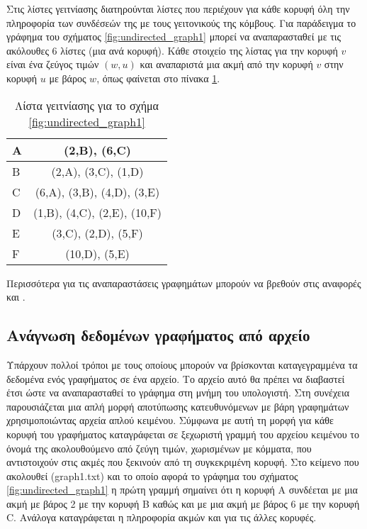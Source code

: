 Στις λίστες γειτνίασης διατηρούνται λίστες που περιέχουν για κάθε κορυφή όλη την πληροφορία των συνδέσεών της με τους γειτονικούς της κόμβους. Για παράδειγμα το γράφημα του σχήματος \ref{fig:undirected_graph1} μπορεί να αναπαρασταθεί με τις ακόλουθες 6 λίστες (μια ανά κορυφή). Κάθε στοιχείο της λίστας για την κορυφή $v$ είναι ένα ζεύγος τιμών $(w,u)$ και αναπαριστά μια ακμή από την κορυφή $v$ στην κορυφή $u$ με βάρος $w$, όπως φαίνεται στο πίνακα \ref{tbl:adjacency_list}.

\begin{table}[ht]
	\centering
	\begin{tabular}{|
		>{\columncolor[HTML]{C0C0C0}}l |c|}
		\hline
		A & (2,B), (6,C)                \\ \hline
		B & (2,A), (3,C), (1,D)         \\ \hline
		C & (6,A), (3,B), (4,D), (3,E)  \\ \hline
		D & (1,B), (4,C), (2,E), (10,F) \\ \hline
		E & (3,C), (2,D), (5,F)         \\ \hline
		F & (10,D), (5,E)               \\ \hline
	\end{tabular}
	\caption{Λίστα γειτνίασης για το σχήμα \ref{fig:undirected_graph1}}
	\label{tbl:adjacency_list}
\end{table}

Περισσότερα για τις αναπαραστάσεις γραφημάτων μπορούν να βρεθούν στις αναφορές \cite{g4g_graph_representations} και \cite{he_graph_representations}.

\subsection{Ανάγνωση δεδομένων γραφήματος από αρχείο}
Υπάρχουν πολλοί τρόποι με τους οποίους μπορούν να βρίσκονται καταγεγραμμένα τα δεδομένα ενός γραφήματος σε ένα αρχείο. Το αρχείο αυτό θα πρέπει να διαβαστεί έτσι ώστε να αναπαρασταθεί το γράφημα στη μνήμη του υπολογιστή. Στη συνέχεια παρουσιάζεται μια απλή μορφή αποτύπωσης κατευθυνόμενων με βάρη γραφημάτων χρησιμοποιώντας αρχεία απλού κειμένου. Σύμφωνα με αυτή τη μορφή για κάθε κορυφή του γραφήματος καταγράφεται σε ξεχωριστή γραμμή του αρχείου κειμένου το όνομά της ακολουθούμενο από ζεύγη τιμών, χωρισμένων με κόμματα, που αντιστοιχούν στις ακμές που ξεκινούν από τη συγκεκριμένη κορυφή. Στο κείμενο που ακολουθεί (graph1.txt) και το οποίο αφορά το γράφημα του σχήματος \ref{fig:undirected_graph1} η πρώτη γραμμή σημαίνει ότι η κορυφή Α συνδέεται με μια ακμή με βάρος 2 με την κορυφή B καθώς και με μια ακμή με βάρος 6 με την κορυφή C. Ανάλογα καταγράφεται η πληροφορία ακμών και για τις άλλες κορυφές.

